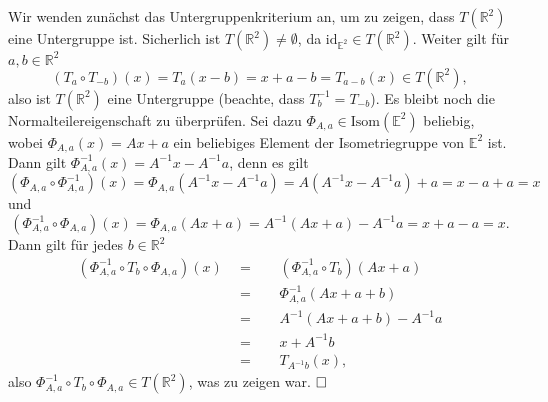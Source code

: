 \documentclass[11pt]{book}
\numberwithin{dummy}{section}
\theoremstyle{nonumberbreak}
\newenvironment{prob}[1][]{\ifthenelse{\equal{#1}{}}{\problem}{\problem[#1]}\rm}{\endproblem}
\newenvironment{sol}[1][]{\ifthenelse{\equal{#1}{}}{\solution}{\solution[#1]}\rm}{\endsolution}
\newcommand{\E}{\mathbb{E}}
\newcommand{\R}{\mathbb{R}}
\newcommand{\id}{\mathrm{id}}
\begin{document}
\begin{spacing}{1.4}
\begin{prob}
\begin{sol}
Wir wenden zunächst das Untergruppenkriterium an, um zu zeigen, dass $T(\R^2)$ eine Untergruppe ist. Sicherlich ist $T(\R^2)\neq \emptyset$, da $\id_{\E^2} \in T(\R^2)$. Weiter gilt für $a,b\in \R^2$
$$(T_a\circ T_{-b})(x)= T_a(x-b)=x+a-b = T_{a-b}(x) \in T(\R^2),$$
also ist $T(\R^2)$ eine Untergruppe (beachte, dass $T_b^{-1}=T_{-b}$). Es bleibt noch die Normalteilereigenschaft zu überprüfen. Sei dazu $\Phi_{A,a} \in \mathrm{Isom}(\E^2)$ beliebig, wobei $\Phi_{A,a}(x)=Ax+a$ ein beliebiges Element der Isometriegruppe von $\E^2$ ist. Dann gilt $\Phi_{A,a}^{-1}(x)=A^{-1}x-A^{-1}a$, denn es gilt
$$(\Phi_{A,a} \circ \Phi_{A,a}^{-1})(x)=\Phi_{A,a}\left( A^{-1}x-A^{-1}a\right) = A(A^{-1}x-A^{-1}a) +a = x-a+a=x$$
und
$$(\Phi_{A,a}^{-1}\circ \Phi_{A,a})(x)=\Phi_{A,a}\left(Ax+a\right) = A^{-1}(Ax+a) - A^{-1}a= x+a-a=x.$$
Dann gilt für jedes $b \in \R^2$
\begin{alignat*}{5}
\left(\Phi_{A,a}^{-1} \circ T_b \circ \Phi_{A,a}\right)(x) \ \ &=&& \ \ \left(\Phi_{A,a}^{-1}\circ T_b\right) \left( Ax+a\right) \\
&=&& \ \ \Phi_{A,a}^{-1}\left(Ax+a+b\right) \\
&=&& \ \ A^{-1}(Ax+a+b) - A^{-1}a \\
&=&& \ \ x+A^{-1}b \\
&=&& \ \ T_{A^{-1}b}(x),
\end{alignat*}
also $\Phi_{A,a}^{-1}\circ T_b \circ \Phi_{A,a} \in T(\R^2)$, was zu zeigen war. $\hfill \Box$

\end{sol}

\end{prob}








\end{spacing}
\end{document}
